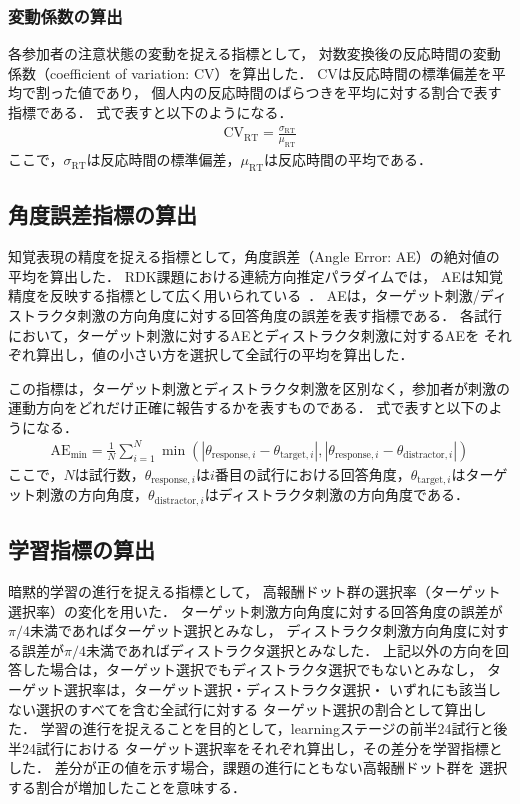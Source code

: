 \subsubsection{変動係数の算出}
各参加者の注意状態の変動を捉える指標として，
対数変換後の反応時間の変動係数（coefficient of variation: CV）を算出した．
CVは反応時間の標準偏差を平均で割った値であり，
個人内の反応時間のばらつきを平均に対する割合で表す指標である．
式で表すと以下のようになる．
\begin{align}
    \text{CV}_\text{RT} = \frac{\sigma_{\text{RT}}}{\mu_{\text{RT}}}
\end{align}
ここで，$\sigma_{\text{RT}}$は反応時間の標準偏差，$\mu_{\text{RT}}$は反応時間の平均である．

\subsection{角度誤差指標の算出}
知覚表現の精度を捉える指標として，角度誤差（Angle Error: AE）の絶対値の平均を算出した．
RDK課題における連続方向推定パラダイムでは，
AEは知覚精度を反映する指標として広く用いられている~\cite{bae2022perception}．
AEは，ターゲット刺激/ディストラクタ刺激の方向角度に対する回答角度の誤差を表す指標である．
各試行において，ターゲット刺激に対するAEとディストラクタ刺激に対するAEを
それぞれ算出し，値の小さい方を選択して全試行の平均を算出した．

この指標は，ターゲット刺激とディストラクタ刺激を区別なく，参加者が刺激の運動方向をどれだけ正確に報告するかを表すものである．
式で表すと以下のようになる．
\begin{align}
    \text{AE}_{\text{min}} = \frac{1}{N} \sum_{i=1}^{N} \min(|\theta_{\text{response},i} - \theta_{\text{target},i}|, |\theta_{\text{response},i} - \theta_{\text{distractor},i}|)
\end{align}
ここで，$N$は試行数，$\theta_{\text{response},i}$は$i$番目の試行における回答角度，$\theta_{\text{target},i}$はターゲット刺激の方向角度，$\theta_{\text{distractor},i}$はディストラクタ刺激の方向角度である．

\subsection{学習指標の算出}
暗黙的学習の進行を捉える指標として，
高報酬ドット群の選択率（ターゲット選択率）の変化を用いた．
ターゲット刺激方向角度に対する回答角度の誤差が$\pi/4$未満であればターゲット選択とみなし，
ディストラクタ刺激方向角度に対する誤差が$\pi/4$未満であればディストラクタ選択とみなした．
上記以外の方向を回答した場合は，ターゲット選択でもディストラクタ選択でもないとみなし，
ターゲット選択率は，ターゲット選択・ディストラクタ選択・
いずれにも該当しない選択のすべてを含む全試行に対する
ターゲット選択の割合として算出した．
学習の進行を捉えることを目的として，learningステージの前半24試行と後半24試行における
ターゲット選択率をそれぞれ算出し，その差分を学習指標とした．
差分が正の値を示す場合，課題の進行にともない高報酬ドット群を
選択する割合が増加したことを意味する．

